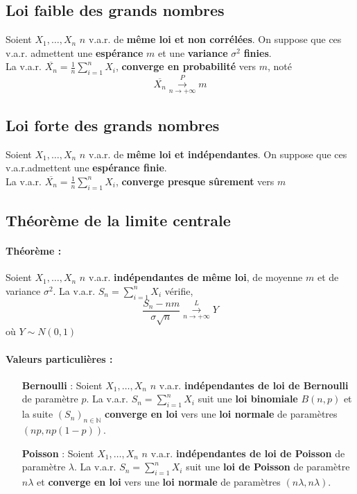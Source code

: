\documentclass[10pt,a4paper,twoside]{article}
\begin{document}
\subsection{Loi faible des grands nombres}
Soient $X_{1},\ldots,X_{n}$ $n$ v.a.r. de \textbf{même loi et non corrélées}. On suppose que ces v.a.r. admettent une \textbf{espérance} $m$ et une \textbf{variance} $\sigma^{2}$ \textbf{finies}. \\
La v.a.r. $\overline{X_{n}}=\frac{1}{n}\sum_{i=1}^{n}X_{i}$,\textbf{ converge en probabilité} vers $m$, noté 
$$\overline{X_{n}}\overset{P}{\underset{n\rightarrow+\infty}{\longrightarrow}}m$$

\subsection{Loi forte des grands nombres}
Soient $X_{1},\ldots,X_{n}$ $n$ v.a.r. de \textbf{même loi et indépendantes}. On suppose que ces v.a.r.admettent une \textbf{espérance finie}.\\
La v.a.r. $\overline{X_{n}}=\frac{1}{n}\sum_{i=1}^{n}X_{i}$,\textbf{ converge presque sûrement} vers $m$

\subsection{Théorème de la limite centrale}
\paragraph{Théorème :} Soient $X_{1},\ldots,X_{n}$ $n$ v.a.r. \textbf{indépendantes de même loi}, de moyenne $m$ et de variance $\sigma^{2}$. La v.a.r. $S_{n}=\sum_{i=1}^{n}X_{i}$ vérifie,
$$\frac{S_{n}-nm}{\sigma\sqrt{n}}\overset{L}{\underset{n\rightarrow+\infty}{\longrightarrow}}Y$$
où $Y\sim N(0,1)$

\paragraph{Valeurs particulières :}
\begin{itemize}
\item[\textbf{Bernoulli} :] Soient $X_{1},\ldots,X_{n}$ $n$ v.a.r. \textbf{indépendantes de loi de Bernoulli} de paramètre $p$. La v.a.r. $S_{n}=\sum_{i=1}^{n}X_{i}$ suit une \textbf{loi binomiale} $B(n,p)$ et la suite $(S_{n})_{n\in\mathbb{N}}$ \textbf{converge en loi} vers une \textbf{loi normale} de paramètres $(np,np(1-p))$.
\item[\textbf{Poisson} :] Soient $X_{1},\ldots,X_{n}$ $n$ v.a.r. \textbf{indépendantes de loi de Poisson} de paramètre $\lambda$. La v.a.r. $S_{n}=\sum_{i=1}^{n}X_{i}$ suit une \textbf{loi de Poisson} de paramètre $n\lambda$ et \textbf{converge en loi} vers une \textbf{loi normale} de paramètres $(n\lambda,n\lambda)$.
\end{itemize}
\end{document}
